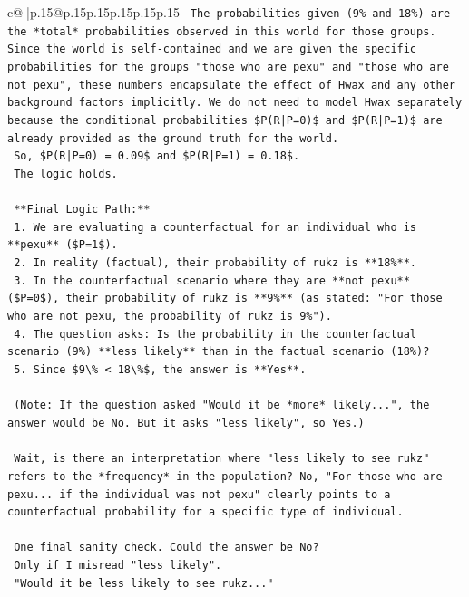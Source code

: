 \documentclass{article}
\begin{document}
{\begin{supertabular}{c@{$\;$}|p{.15\linewidth}@{}p{.15\linewidth}p{.15\linewidth}p{.15\linewidth}p{.15\linewidth}p{.15\linewidth}}
{{{\texttt{    The probabilities given (9\% and 18\%) are the *total* probabilities observed in this world for those groups. Since the world is self{-}contained and we are given the specific probabilities for the groups "those who are pexu" and "those who are not pexu", these numbers encapsulate the effect of Hwax and any other background factors implicitly. We do not need to model Hwax separately because the conditional probabilities \$P(R|P=0)\$ and \$P(R|P=1)\$ are already provided as the ground truth for the world.} \\
\texttt{    So, \$P(R|P=0) = 0.09\$ and \$P(R|P=1) = 0.18\$.} \\
\texttt{    The logic holds.} \\
\\ 
\texttt{    **Final Logic Path:**} \\
\texttt{    1.  We are evaluating a counterfactual for an individual who is **pexu** (\$P=1\$).} \\
\texttt{    2.  In reality (factual), their probability of rukz is **18\%**.} \\
\texttt{    3.  In the counterfactual scenario where they are **not pexu** (\$P=0\$), their probability of rukz is **9\%** (as stated: "For those who are not pexu, the probability of rukz is 9\%").} \\
\texttt{    4.  The question asks: Is the probability in the counterfactual scenario (9\%) **less likely** than in the factual scenario (18\%)?} \\
\texttt{    5.  Since \$9\textbackslash{}\% < 18\textbackslash{}\%\$, the answer is **Yes**.} \\
\\ 
\texttt{    (Note: If the question asked "Would it be *more* likely...", the answer would be No. But it asks "less likely", so Yes.)} \\
\\ 
\texttt{    Wait, is there an interpretation where "less likely to see rukz" refers to the *frequency* in the population? No, "For those who are pexu... if the individual was not pexu" clearly points to a counterfactual probability for a specific type of individual.} \\
\\ 
\texttt{    One final sanity check. Could the answer be No?} \\
\texttt{    Only if I misread "less likely".} \\
\texttt{    "Would it be less likely to see rukz..."} \\
}}}
\end{supertabular}}
\end{document}
